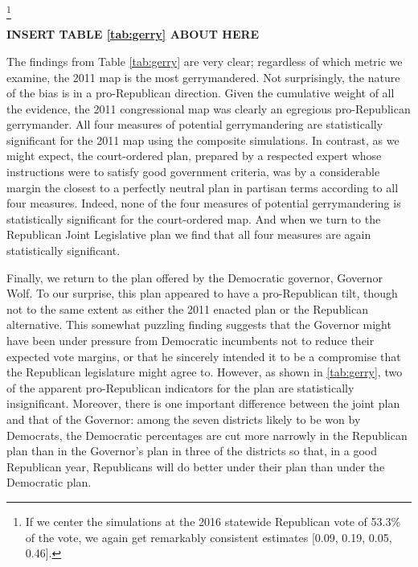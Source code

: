 		\footnote{If we center the simulations at the 2016 statewide Republican vote of 53.3\% of the vote, we again get remarkably consistent estimates [0.09, 0.19, 0.05, 0.46].}
%
	
		\begin{center}\textbf{INSERT TABLE \ref{tab:gerry} ABOUT HERE} \end{center}
\par
    The findings from Table \ref{tab:gerry} are very clear; regardless of which metric we examine, the 2011 map is the most gerrymandered. Not surprisingly, the nature of the bias is in a pro-Republican direction. Given the cumulative weight of all the evidence, the 2011 congressional map was clearly an egregious pro-Republican gerrymander. All four measures of potential gerrymandering are statistically significant for the 2011 map using the composite simulations. In contrast, as we might expect, the court-ordered plan, prepared by a respected expert whose instructions were to satisfy good government criteria, was by a considerable margin the closest to a perfectly neutral plan in partisan terms according to all four measures. Indeed, none of the four measures of potential gerrymandering is statistically significant for the court-ordered map. And when we turn to the Republican Joint Legislative plan we find that all four measures are again statistically significant.  
\par
    Finally, we return to the plan offered by the Democratic governor, Governor Wolf. To our surprise, this plan appeared to have a pro-Republican tilt, though not to the same extent as either the 2011 enacted plan or the Republican alternative. This somewhat puzzling finding suggests that the Governor might have been under pressure from Democratic incumbents not to reduce their expected vote margins, or that he sincerely intended it to be a compromise that the Republican legislature might agree to. However, as shown in \ref{tab:gerry}, two of the apparent pro-Republican indicators for the plan are statistically insignificant. Moreover, there is one important difference between the joint plan and that of the Governor: among the seven districts likely to be won by Democrats, the Democratic percentages are cut more narrowly in the Republican plan than in the Governor’s plan in three of the districts so that, in a good Republican year, Republicans will do better under their plan than under the Democratic plan.

